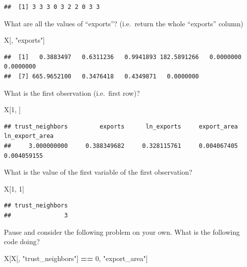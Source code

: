 \documentclass[
]{book}
\newenvironment{Shaded}{\begin{snugshade}}{\end{snugshade}}
\newcommand{\DecValTok}[1]{\textcolor[rgb]{0.00,0.00,0.81}{#1}}
\newcommand{\NormalTok}[1]{#1}
\newcommand{\OperatorTok}[1]{\textcolor[rgb]{0.81,0.36,0.00}{\textbf{#1}}}
\newcommand{\StringTok}[1]{\textcolor[rgb]{0.31,0.60,0.02}{#1}}
\theoremstyle{definition}
\theoremstyle{definition}
\theoremstyle{definition}
\theoremstyle{remark}
\begin{document}
\begin{verbatim}
##  [1] 3 3 3 0 3 2 2 0 3 3
\end{verbatim}

What are all the values of ``exports''? (i.e.~return the whole ``exports'' column)

\begin{Shaded}
\begin{Highlighting}[]
\NormalTok{X[, }\StringTok{"exports"}\NormalTok{]}
\end{Highlighting}
\end{Shaded}

\begin{verbatim}
##  [1]   0.3883497   0.6311236   0.9941893 182.5891266   0.0000000   0.0000000
##  [7] 665.9652100   0.3476418   0.4349871   0.0000000
\end{verbatim}

What is the first observation (i.e.~first row)?

\begin{Shaded}
\begin{Highlighting}[]
\NormalTok{X[}\DecValTok{1}\NormalTok{, ]}
\end{Highlighting}
\end{Shaded}

\begin{verbatim}
## trust_neighbors         exports      ln_exports     export_area  ln_export_area 
##     3.000000000     0.388349682     0.328115761     0.004067405     0.004059155
\end{verbatim}

What is the value of the first variable of the first observation?

\begin{Shaded}
\begin{Highlighting}[]
\NormalTok{X[}\DecValTok{1}\NormalTok{, }\DecValTok{1}\NormalTok{]}
\end{Highlighting}
\end{Shaded}

\begin{verbatim}
## trust_neighbors 
##               3
\end{verbatim}

Pause and consider the following problem on your own. What is the following code doing?

\begin{Shaded}
\begin{Highlighting}[]
\NormalTok{X[X[, }\StringTok{"trust\_neighbors"}\NormalTok{] }\OperatorTok{==}\StringTok{ }\DecValTok{0}\NormalTok{, }\StringTok{"export\_area"}\NormalTok{]}
\end{Highlighting}
\end{Shaded}
\end{document}
